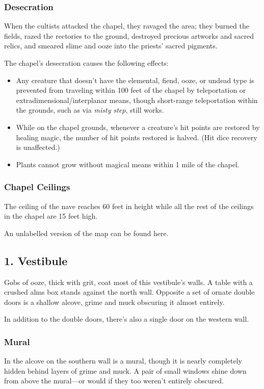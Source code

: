 \documentclass[10pt,a4paper,twoside,bg=print,twocolumn,openany,nodeprecatedcode]{dndbook}
\begin{document}
\subsubsection{Desecration}
When the cultists attacked the chapel, they ravaged the area; they burned the fields, razed the rectories to the ground, destroyed precious artworks and sacred relics, and smeared slime and ooze into the priests' sacred pigments.

The chapel's desecration causes the following effects:


\begin{itemize}
\item Any creature that doesn't have the elemental, fiend, ooze, or undead type is prevented from traveling within 100 feet of the chapel by teleportation or extradimensional/interplanar means, though short-range teleportation within the grounds, such as via \textit{misty step}, still works.
\item While on the chapel grounds, whenever a creature's hit points are restored by healing magic, the number of hit points restored is halved. (Hit dice recovery is unaffected.)
\item Plants cannot grow without magical means within 1 mile of the chapel.
\end{itemize}

\subsubsection{Chapel Ceilings}
The ceiling of the nave reaches 60 feet in height while all the rest of the ceilings in the chapel are 15 feet high.

An unlabelled version of the map can be found here.

\subsection{1. Vestibule}
\begin{DndReadAloud}{}
Gobs of ooze, thick with grit, coat most of this vestibule's walls. A table with a crushed alms box stands against the north wall. Opposite a set of ornate double doors is a shallow alcove, grime and muck obscuring it almost entirely.

\end{DndReadAloud}

In addition to the double doors, there's also a single door on the western wall.

\subsubsection{Mural}
In the alcove on the southern wall is a mural, though it is nearly completely hidden behind layers of grime and muck. A pair of small windows shine down from above the mural—or would if they too weren't entirely obscured.
\end{document}
